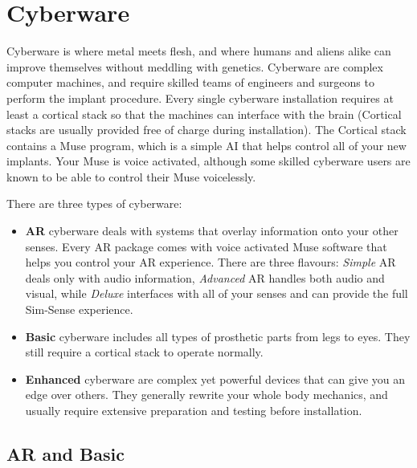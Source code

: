 \documentclass[10pt,twoside]{article}
\begin{document}
  \newpage


  \section{Cyberware}

  \begin{multicols}{2}

  Cyberware is where metal meets flesh, and where humans and aliens alike can improve themselves without meddling with genetics. Cyberware are complex computer machines, and require skilled teams of engineers and surgeons to perform the implant procedure. Every single cyberware installation requires at least a cortical stack so that the machines can interface with the brain (Cortical stacks are usually provided free of charge during installation). The Cortical stack contains a Muse program, which is a simple AI that helps control all of your new implants. Your Muse is voice activated, although some skilled cyberware users are known to be able to control their Muse voicelessly.

  There are three types of cyberware:

  \begin{itemize}
    \item \textbf{AR} cyberware deals with systems that overlay information onto your other senses. Every AR package comes with voice activated Muse software that helps you control your AR experience. There are three flavours: \textit{Simple} AR deals only with audio information, \textit{Advanced} AR handles both audio and visual, while \textit{Deluxe} interfaces with all of your senses and can provide the full Sim-Sense experience.
    \item \textbf{Basic} cyberware includes all types of prosthetic parts from legs to eyes. They still require a cortical stack to operate normally.
    \item \textbf{Enhanced} cyberware are complex yet powerful devices that can give you an edge over others. They generally rewrite your whole body mechanics, and usually require extensive preparation and testing before installation.
  \end{itemize}

  \subsection{AR and Basic}


\end{multicols}
\end{document}
